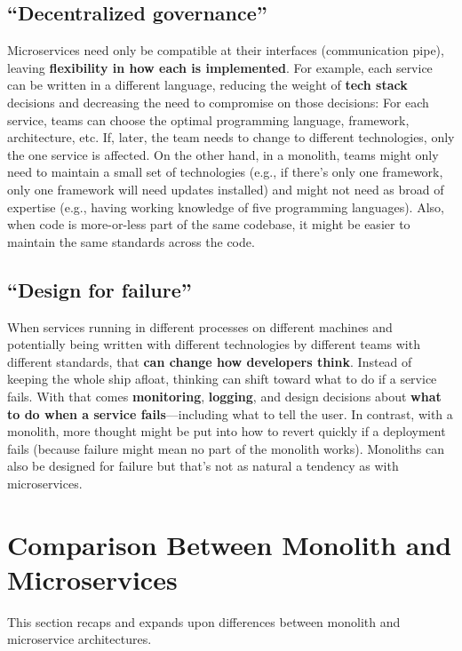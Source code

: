 \subsection{``Decentralized governance''}

Microservices need only be compatible at their interfaces (communication pipe), leaving \textbf{flexibility in how each is implemented}. For example, each service can be written in a different language, reducing the weight of \textbf{tech stack} decisions and decreasing the need to compromise on those decisions: For each service, teams can choose the optimal programming language, framework, architecture, etc. If, later, the team needs to change to different technologies, only the one service is affected. On the other hand, in a monolith, teams might only need to maintain a small set of technologies (e.g., if there's only one framework, only one framework will need updates installed) and might not need as broad of expertise (e.g., having working knowledge of five programming languages). Also, when code is more-or-less part of the same codebase, it might be easier to maintain the same standards across the code.

\subsection{``Design for failure''}

When services running in different processes on different machines and potentially being written with different technologies by different teams with different standards, that \textbf{can change how developers think}. Instead of keeping the whole ship afloat, thinking can shift toward what to do if a service fails. With that comes \textbf{monitoring}, \textbf{logging}, and design decisions about \textbf{what to do when a service fails}---including what to tell the user. In contrast, with a monolith, more thought might be put into how to revert quickly if a deployment fails (because failure might mean no part of the monolith works). Monoliths can also be designed for failure but that's not as natural a tendency as with microservices.

\section{Comparison Between Monolith and Microservices}

This section recaps and expands upon differences between monolith and microservice architectures.

